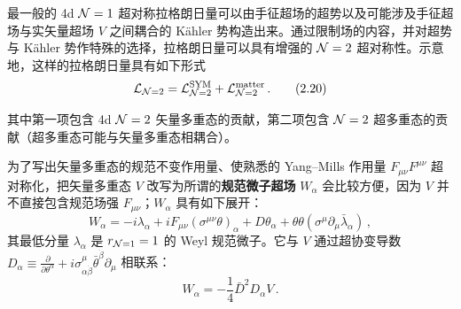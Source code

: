 最一般的 4d $\mathcal{N}=1$ 超对称拉格朗日量可以由手征超场的超势以及可能涉及手征超场与实矢量超场 $V$ 之间耦合的 Kähler 势构造出来。通过限制场的内容，并对超势与 Kähler 势作特殊的选择，拉格朗日量可以具有增强的 $\mathcal{N}=2$ 超对称性。示意地，这样的拉格朗日量具有如下形式
\begin{equation}
  \mathcal{L}_{\mathcal{N}=2}=\mathcal{L}^{\mathrm{SYM}}_{\mathcal{N}=2}+\mathcal{L}^{\mathrm{matter}}_{\mathcal{N}=2}\,.
  \tag{2.20}
\end{equation}

其中第一项包含 4d $\mathcal{N}=2$ 矢量多重态的贡献，第二项包含 $\mathcal{N}=2$ 超多重态的贡献（超多重态可能与矢量多重态相耦合）。

为了写出矢量多重态的规范不变作用量、使熟悉的 Yang--Mills 作用量 $F_{\mu\nu}F^{\mu\nu}$ 超对称化，把矢量多重态 $V$ 改写为所谓的\textbf{规范微子超场} $W_\alpha$ 会比较方便，因为 $V$ 并不直接包含规范场强 $F_{\mu\nu}$；$W_\alpha$ 具有如下展开：
\begin{equation}
  W_\alpha=-i\lambda_\alpha+iF_{\mu\nu}(\sigma^{\mu\nu}\theta)_\alpha+D\theta_\alpha+\theta\theta(\sigma^\mu\partial_\mu\bar\lambda_\alpha)\,,
  \tag{2.21}
\end{equation}
其最低分量 $\lambda_\alpha$ 是 $r_{\mathcal{N}=1}=1$ 的 Weyl 规范微子。它与 $V$ 通过超协变导数 $D_\alpha\equiv\frac{\partial}{\partial\theta^\alpha}+i\sigma^\mu_{\alpha\dot\beta}\bar\theta^{\dot\beta}\partial_\mu$ 相联系：
\begin{equation}
  W_\alpha=-\frac14\bar D^2D_\alpha V\,.
  \tag{2.22}
\end{equation}


